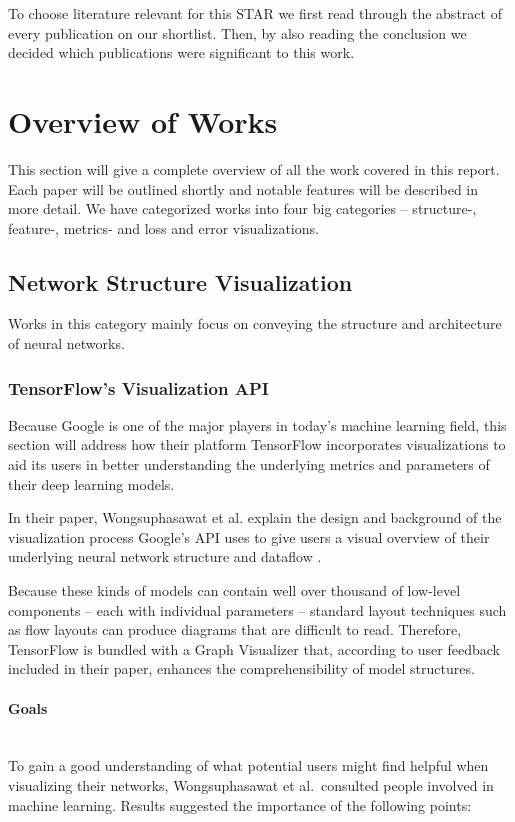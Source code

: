 \documentclass{acmsiggraph}               %
\newcommand{\paragraphbr}[1]{\paragraph{#1}\mbox{}\\}
\begin{document}
To choose literature relevant for this STAR we first read through the abstract of every publication on our shortlist. Then, by also reading the conclusion we decided which publications were significant to this work.

\section{Overview of Works}
This section will give a complete overview of all the work covered in this report. Each paper will be outlined shortly and notable features will be described in more detail. We have categorized works into four big categories -- structure-, feature-, metrics- and loss and error visualizations.

\subsection{Network Structure Visualization}
Works in this category mainly focus on conveying the structure and architecture of neural networks.

\subsubsection{TensorFlow's Visualization API}
Because Google is one of the major players in today's machine learning field, this section will address how their platform TensorFlow incorporates visualizations to aid its users in better understanding the underlying metrics and parameters of their deep learning models.

In their paper, Wongsuphasawat et al. explain the design and background of the visualization process Google's API uses to give users a visual overview of their underlying neural network structure and dataflow \cite{Wongsuphasawat2018}.

Because these kinds of models can contain well over thousand of low-level components -- each with individual parameters -- standard layout techniques such as flow layouts can produce diagrams that are difficult to read. Therefore, TensorFlow is bundled with a Graph Visualizer that, according to user feedback included in their paper, enhances the comprehensibility of model structures.

\paragraphbr{Goals}

To gain a good understanding of what potential users might find helpful when visualizing their networks, Wongsuphasawat et al.~consulted people involved in machine learning. Results suggested the importance of the following points:
\end{document}
